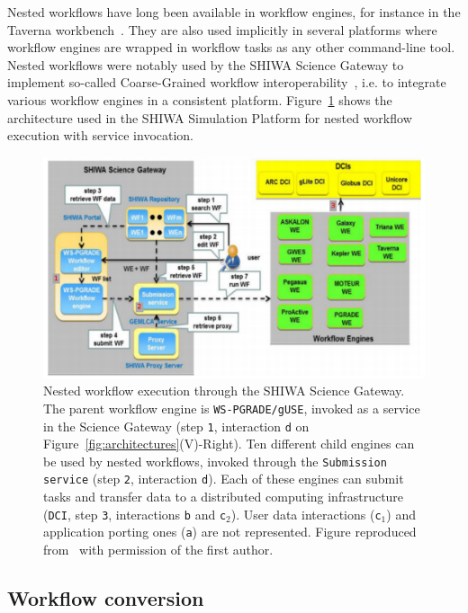 \documentclass[preprint,3p,twocolumn]{elsarticle}
\begin{document}
Nested workflows have long been available in workflow engines, for
instance in the Taverna workbench~\cite{oinn2004taverna}. They are
also used implicitly in several platforms where workflow engines are
wrapped in workflow tasks as any other command-line tool. Nested
workflows were notably used by the SHIWA Science Gateway to implement
so-called Coarse-Grained workflow
interoperability~\cite{terstyanszky2014enabling}, i.e. to integrate
various workflow engines in a consistent
platform. Figure~\ref{fig:shiwa-architecture} shows the architecture
used in the SHIWA Simulation Platform for nested workflow execution
with service invocation.
\begin{figure}
\centering
\includegraphics[width=1.5\columnwidth]{figures/shiwa-science-gateway.pdf}
\caption{Nested workflow execution through the SHIWA Science Gateway. The
  parent workflow engine is \texttt{WS-PGRADE/gUSE}, invoked as a service
  in the Science Gateway (step \texttt{1}, interaction \texttt{d} on
  Figure~\ref{fig:architectures}(V)-Right). Ten different child engines can be used by nested
  workflows, invoked through the \texttt{Submission service} (step
  \texttt{2}, interaction \texttt{d}). Each of these engines can
  submit tasks and transfer data to a distributed computing
  infrastructure (\texttt{DCI}, step \texttt{3}, interactions
  \texttt{b} and \texttt{c$_2$}). User data interactions (\texttt{c$_1$}) and
  application porting ones (\texttt{a}) are not represented. Figure
  reproduced from~\cite{terstyanszky2014enabling} with permission of
  the first author.}
\label{fig:shiwa-architecture}
\end{figure}

\subsection{Workflow conversion}
\end{document}
